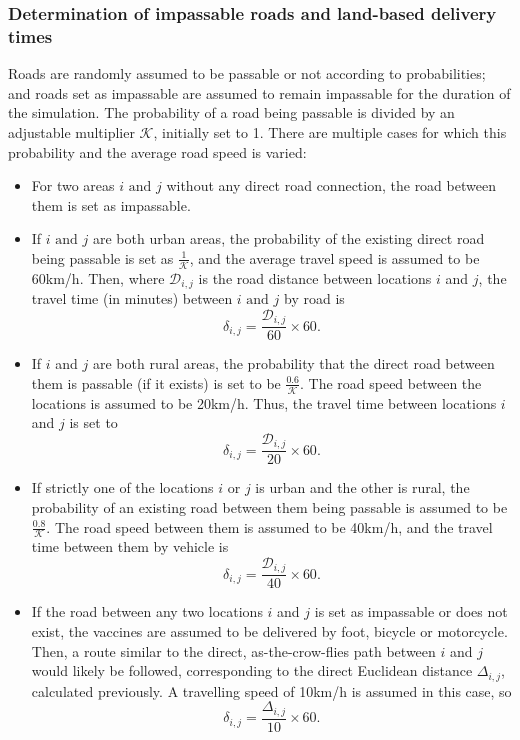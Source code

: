\subsubsection{Determination of impassable roads and land-based delivery times}
Roads are randomly assumed to be passable or not according to probabilities; and roads set as impassable are assumed to remain impassable for the duration of the simulation. The probability of a road being passable is divided by an adjustable multiplier $\mathcal{K}$, initially set to 1. There are multiple cases for which this probability and the average road speed is varied:

\begin{itemize}
    \item For two areas $i \text{ and } j$ without any direct road connection, the road between them is set as impassable.
    \item If $i \text{ and } j$ are both urban areas, the probability of the existing direct road being passable is set as $\frac{1}{\mathcal{K}}$, and the average travel speed is assumed to be 60km/h. Then, where $\mathcal{D}_{i,j}$ is the road distance between locations $i$ and $j$, the travel time (in minutes) between $i \text{ and } j$ by road is $$\delta_{i,j} = \frac{\mathcal{D}_{i,j}}{60} \times 60.$$
    \item If $i$ and $j$ are both rural areas, the probability that the direct road between them is passable (if it exists) is set to be $\frac{0.6}{\mathcal{K}}$. The road speed between the locations is assumed to be 20km/h. Thus, the travel time between locations $i$ and $j$ is set to $$\delta_{i,j} = \frac{\mathcal{D}_{i,j}}{20} \times 60.$$
    \item If strictly one of the locations $i$ or $j$ is urban and the other is rural, the probability of an existing road between them being passable is assumed to be $\frac{0.8}{\mathcal{K}}.$ The road speed between them is assumed to be 40km/h, and the travel time between them by vehicle is $$\delta_{i,j} = \frac{\mathcal{D}_{i,j}}{40} \times 60.$$
    \item If the road between any two locations $i$ and $j$ is set as impassable or does not exist, the vaccines are assumed to be delivered by foot, bicycle or motorcycle. Then, a route similar to the direct, as-the-crow-flies path between $i$ and $j$ would likely be followed, corresponding to the direct Euclidean distance $\Delta_{i,j}$, calculated previously. A travelling speed of 10km/h is assumed in this case, so $$\delta_{i,j} = \frac{\Delta_{i,j}}{10} \times 60.$$
\end{itemize}

